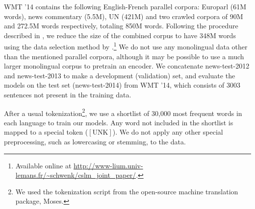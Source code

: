 \documentclass{article} %
\begin{document}
WMT '14 contains the following English-French parallel corpora: Europarl (61M
words), news commentary (5.5M), UN (421M) and two crawled corpora of 90M and
272.5M words respectively, totaling 850M words. 
Following the procedure described
in \citet{Cho2014}, we reduce the size of the combined corpus to have 348M words
using the data selection method by \citet{Axelrod2011}.\footnote{
    Available online at
    \url{http://www-lium.univ-lemans.fr/~schwenk/cslm_joint_paper/}.
} We do not use any monolingual data other than the mentioned parallel corpora,
although it may be possible to use a much larger monolingual corpus to pretrain
an encoder. We concatenate news-test-2012 and news-test-2013 to make a
development (validation) set, and evaluate the models on the test set
(news-test-2014) from WMT '14, which consists of 3003 sentences not present in
the training data. 

After a usual tokenization\footnote{
    We used the tokenization script from the open-source machine translation
    package, Moses. 
}, 
we use a shortlist of 30,000 most frequent words in each language to train our
models. Any word not included in the shortlist is mapped to a special token
($\left[ \mbox{UNK} \right]$). We do not apply any other special preprocessing,
such as lowercasing or stemming, to the data.
\end{document}
